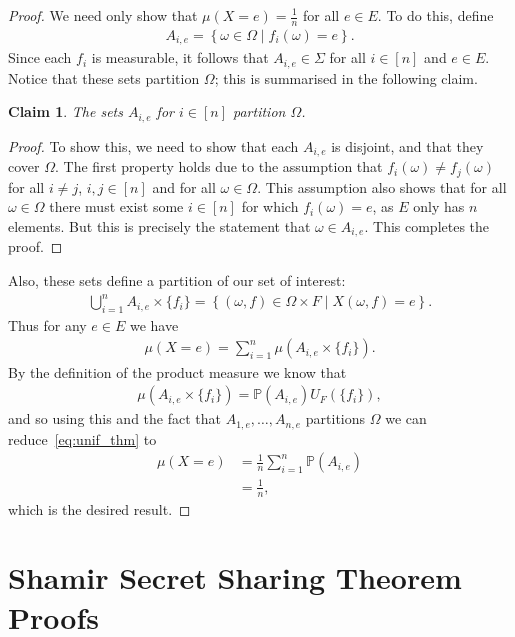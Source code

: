 \documentclass{article}
\newcommand{\set}[2]{\left\{ #1 \middle| #2 \right\}}
\newcommand{\seq}[1]{\left[#1\right]}
\newtheorem{claim}{Claim}
\theoremstyle{remark}
\renewcommand{\P}{\mathbb{P}}
\begin{document}
\begin{proof}
	We need only show that $\mu(X = e) = \frac{1}{n}$ for all $e \in E$. To do
	this, define
	\begin{align*}
		A_{i,e} = \set{\omega \in \Omega}{f_i(\omega) = e}.
	\end{align*}
	Since each $f_i$ is measurable, it follows that $A_{i,e} \in \Sigma$ for
	all $i \in \seq{n}$ and $e \in E$. Notice that these sets partition
	$\Omega$; this is summarised in the following claim.
	\begin{claim}
		The sets $A_{i,e}$ for $i \in \seq{n}$ partition $\Omega$.
	\end{claim}
	\begin{proof}
		To show this, we need to show that each $A_{i,e}$ is disjoint, and that
		they cover $\Omega$. The first property holds due to the assumption
		that $f_i(\omega) \ne f_j(\omega)$ for all $i \ne j$, $i, j \in
		\seq{n}$ and for all $\omega \in \Omega$. This assumption also shows
		that for all $\omega \in \Omega$ there must exist some $i \in \seq{n}$
		for which $f_i(\omega) = e$, as $E$ only has $n$ elements. But this is
		precisely the statement that $\omega \in A_{i,e}$. This completes the
		proof.
	\end{proof}
	Also, these sets define a partition of our set of interest:
	\begin{align*}
		\bigcup_{i=1}^n A_{i,e} \times \{f_i\}
		= \set{(\omega, f) \in \Omega \times F}{X(\omega, f) = e}.
	\end{align*}
	Thus for any $e \in E$ we have
	\begin{align}
		\label{eq:unif_thm}\mu(X = e) =
		\sum_{i=1}^n \mu\left(A_{i,e} \times \{f_i\}\right).
	\end{align}
	By the definition of the product measure we know that
	\begin{align*}
		\mu(A_{i,e} \times \{f_i\}) = \P(A_{i,e})U_F(\{f_i\}),
	\end{align*}
	and so using this and the fact that $A_{1,e}, \ldots, A_{n,e}$ partitions
	$\Omega$ we can reduce~\eqref{eq:unif_thm} to
	\begin{align*}
		\mu(X = e) &= \frac{1}{n}\sum_{i=1}^n \P(A_{i,e})\\
		&= \frac{1}{n},
	\end{align*}
	which is the desired result.
\end{proof}

\section{Shamir Secret Sharing Theorem Proofs}\label{app:shamir}
\end{document}
